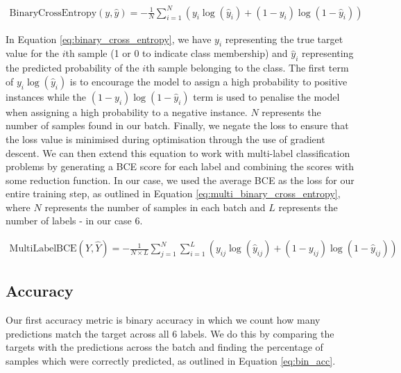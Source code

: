 \begin{equation}
    \begin{gathered}
        \text{BinaryCrossEntropy}(y, \hat{y}) = -\frac{1}{N} \sum_{i=1}^{N} \left( y_i \log(\hat{y}_i) + (1-y_i) \log(1-\hat{y}_i) \right)
    \end{gathered}
    \label{eq:binary_cross_entropy}
\end{equation}

In Equation \ref{eq:binary_cross_entropy}, we have $y_i$ representing the true target value for the $i$th sample (1 or 0 to indicate class membership) and $\hat{y}_i$ representing the predicted probability of the $i$th sample belonging to the class. The first term of $y_i \log(\hat{y}_i)$ is to encourage the model to assign a high probability to positive instances while the $(1-y_i) \log(1-\hat{y}_i)$ term is used to penalise the model when assigning a high probability to a negative instance. $N$ represents the number of samples found in our batch. Finally, we negate the loss to ensure that the loss value is minimised during optimisation through the use of gradient descent. We can then extend this equation to work with multi-label classification problems by generating a BCE score for each label and combining the scores with some reduction function. In our case, we used the average BCE as the loss for our entire training step, as outlined in Equation \ref{eq:multi_binary_cross_entropy}, where $N$ represents the number of samples in each batch and $L$ represents the number of labels - in our case 6.

\begin{equation}
    \begin{gathered}
        \text{MultiLabelBCE}(Y, \hat{Y}) = -\frac{1}{N \times L} \sum_{j=1}^{N} \sum_{i=1}^{L} \left( y_{ij} \log(\hat{y}_{ij}) + (1-y_{ij}) \log(1-\hat{y}_{ij}) \right)
    \end{gathered}
    \label{eq:multi_binary_cross_entropy}
\end{equation}

\subsection{Accuracy}

Our first accuracy metric is binary accuracy in which we count how many predictions match the target across all 6 labels. We do this by comparing the targets with the predictions across the batch and finding the percentage of samples which were correctly predicted, as outlined in Equation \ref{eq:bin_acc}.

